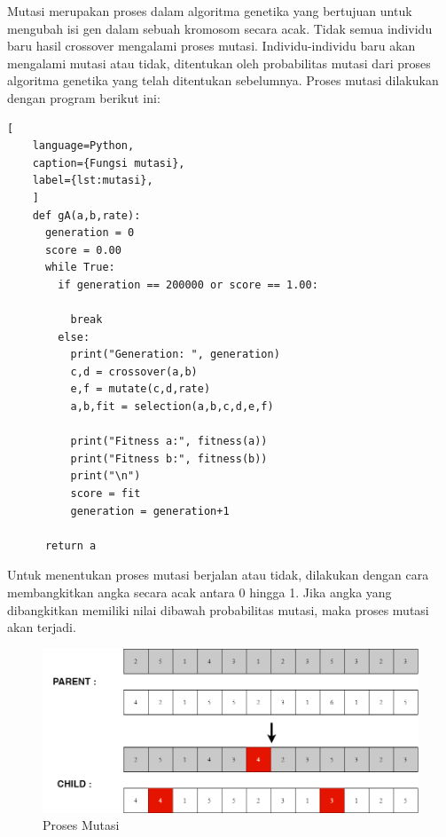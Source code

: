   Mutasi merupakan proses dalam algoritma genetika yang bertujuan untuk mengubah \linebreak isi gen dalam sebuah kromosom secara acak. 
  Tidak semua individu baru hasil crossover \linebreak mengalami proses mutasi. 
  Individu-individu baru akan mengalami mutasi atau tidak, \linebreak ditentukan oleh probabilitas mutasi dari proses algoritma genetika yang telah ditentukan sebelumnya. 
  Proses mutasi dilakukan dengan program berikut ini:
  \begin{lstlisting}[
    language=Python,
    caption={Fungsi mutasi},
    label={lst:mutasi},
    ]
    def gA(a,b,rate):
      generation = 0
      score = 0.00
      while True:
        if generation == 200000 or score == 1.00:
          
          break
        else:
          print("Generation: ", generation)
          c,d = crossover(a,b)
          e,f = mutate(c,d,rate)
          a,b,fit = selection(a,b,c,d,e,f)
          
          print("Fitness a:", fitness(a))
          print("Fitness b:", fitness(b))
          print("\n")
          score = fit
          generation = generation+1

      return a    
  \end{lstlisting}
  Untuk menentukan proses mutasi berjalan atau tidak, dilakukan dengan cara membangkitkan angka secara acak antara 0 hingga 1. 
  Jika angka yang dibangkitkan memiliki nilai dibawah probabilitas mutasi, maka proses mutasi akan terjadi.
  \begin{figure} [ht] \centering
    \includegraphics[scale=0.4]{gambar/mutation.png}
    \caption{Proses Mutasi}
    \label{fig:mutate}
  \end{figure}


